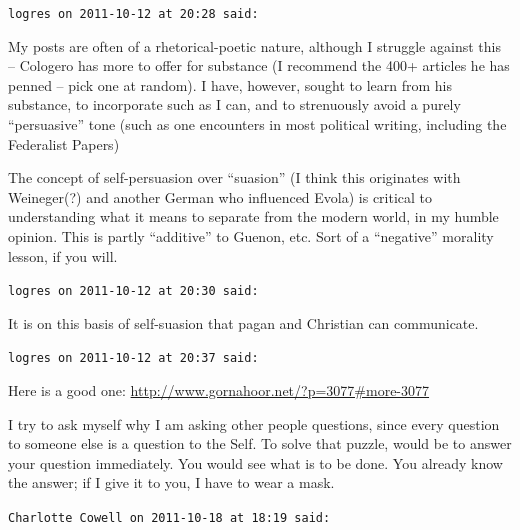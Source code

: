 \begin{footnotesize}
\begin{sffamily}

\texttt{logres on 2011-10-12 at 20:28 said:}

My posts are often of a rhetorical-poetic nature, although I struggle against this -- Cologero has more to offer for substance (I recommend the 400+ articles he has penned -- pick one at random). I have, however, sought to learn from his substance, to incorporate such as I can, and to strenuously avoid a purely ``persuasive'' tone (such as one encounters in most political writing, including the Federalist Papers)

The concept of self-persuasion over ``suasion'' (I think this originates with Weineger(?) and another German who influenced Evola) is critical to understanding what it means to separate from the modern world, in my humble opinion. This is partly ``additive'' to Guenon, etc. Sort of a ``negative'' morality lesson, if you will.

\hfill

\texttt{logres on 2011-10-12 at 20:30 said:}

It is on this basis of self-suasion that pagan and Christian can communicate.

\hfill

\texttt{logres on 2011-10-12 at 20:37 said:}

Here is a good one: \url{http://www.gornahoor.net/?p=3077\#more-3077}

I try to ask myself why I am asking other people questions, since every question to someone else is a question to the Self. To solve that puzzle, would be to answer your question immediately. You would see what is to be done. You already know the answer; if I give it to you, I have to wear a mask.

\hfill

\texttt{Charlotte Cowell on 2011-10-18 at 18:19 said:}


\end{sffamily}
\end{footnotesize}
